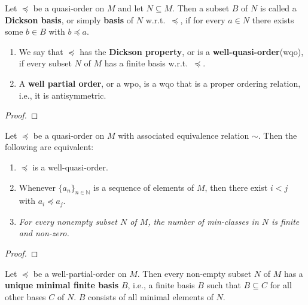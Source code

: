 \begin{definition}\label{def:wqo}
    \leanok %
    Let $\preceq$ be a quasi-order on $M$ and let $N \subseteq M$. 
    Then a subset $B$ of $N$ is called a \textbf{Dickson basis}, or simply \textbf{basis} of $N$ w.r.t.\ $\preceq$, if for every $a \in N$ there exists some $b \in B$ with $b \preceq a$.
    \begin{enumerate}
        \item We say that $\preceq$ has the \textbf{Dickson property}, or is a \textbf{well-quasi-order}(wqo), if every subset $N$ of $M$ has a finite basis w.r.t.\ $\preceq$.
        \item A \textbf{well partial order}, or a wpo, is a wqo that is a proper ordering relation, i.e., it is antisymmetric.
    \end{enumerate}
\end{definition}
\begin{proof}
  \leanok %
\end{proof}
    
\begin{proposition}\label{prop:wqoEquivalent} %
    \leanok %
    Let $\preceq$ be a quasi-order on $M$ with associated equivalence relation $\sim$. 
    Then the following are equivalent:
    \begin{enumerate}
        \item $\preceq$ is a well-quasi-order.
        \item Whenever $\{a_n\}_{n \in \mathbb{N}}$ is a sequence of elements of $M$, then there exist $i < j$ with $a_i \preceq a_j$.
        \item \textit{For every nonempty subset $N$ of $M$, the number of min-classes in $N$ is finite and non-zero.}
    \end{enumerate}
\end{proposition}
\begin{proof}
  \leanok %
\end{proof}
    
\begin{corollary}\label{cor:MinimalFiniteBasis} %
    Let $\preceq$ be a well-partial-order on $M$.
    Then every non-empty subset $N$ of $M$ has a \textup{\textbf{unique minimal finite basis}} $B$, i.e., a finite basis $B$ such that $B \subseteq C$ for all other bases $C$ of $N$. 
    $B$ consists of all minimal elements of $N$.
\end{corollary}
    
